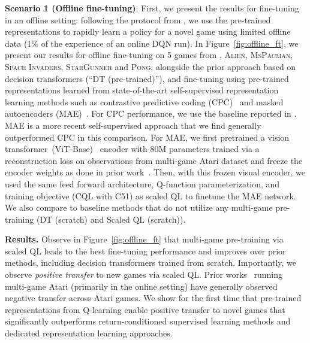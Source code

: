 \textbf{Scenario 1 (Offline fine-tuning)}: First, we present the results for fine-tuning in an offline setting: following the protocol from \citet{lee2022multi}, we use the pre-trained representations to rapidly learn a policy for a novel game using limited offline data (1\% of the experience of an online DQN run). In Figure~\ref{fig:offline_ft}, we present our results for offline fine-tuning on 5 games from \citet{lee2022multi}, \textsc{Alien, MsPacman, Space Invaders, StarGunner} and \textsc{Pong}, alongside the prior approach based on decision transformers (``DT (pre-trained)''), and fine-tuning using pre-trained representations learned from state-of-the-art self-supervised representation learning methods such as contrastive predictive coding (CPC)~\citep{oord2018representation} and masked autoencoders (MAE)~\citep{he2111masked}. For CPC performance, we use the baseline reported in \citet{lee2022multi}. MAE is a more recent self-supervised approach that we find generally outperformed CPC in this comparison. For MAE, we first pretrained a vision transformer~(ViT-Base)~\citep{dosovitskiy2020image} encoder with 80M parameters trained via a reconstruction loss on observations from multi-game Atari dataset and freeze the encoder weights as done in prior work~\citep{xiao2022masked}. 
Then, with this frozen visual encoder, we used the same feed forward architecture, Q-function parameterization, and training objective (CQL with C51) as scaled QL to finetune the MAE network. We also compare to baseline methods that do not utilize any multi-game pre-training (DT (scratch) and Scaled QL (scratch)). 

\textbf{Results.} Observe in Figure~\ref{fig:offline_ft} that multi-game pre-training via scaled QL leads to the best fine-tuning performance and improves over prior methods, including decision transformers trained from scratch. %
Importantly, we observe \emph{positive transfer} to new games via scaled QL. Prior works~\citep{badia2020agent57}
running multi-game Atari (primarily in the online setting) have generally observed negative transfer across Atari games. We show for the first time that pre-trained representations from Q-learning enable positive transfer to novel games that significantly outperforms return-conditioned supervised learning methods and dedicated representation learning approaches.

